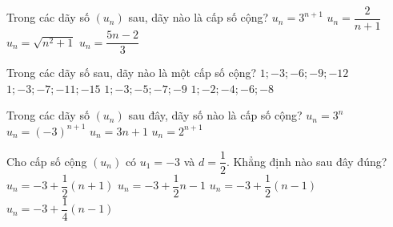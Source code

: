 \begin{ex}%
	Trong các dãy số $(u_n)$ sau, dãy nào là  cấp số cộng?
	 \choice
		 {$u_n={3^{n+1}}$}
		{$u_n=\dfrac{2}{n+1}$} 
		{$u_n=\sqrt{{n^2}+1}$} 
		{\True  $u_n=\dfrac{5n-2}{3}$}
\end{ex}

\begin{ex}%
	Trong các dãy số sau, dãy nào  là một cấp số cộng?
	\choice 
		 {$1;-3;-6;-9;-12$}
		 {\True $1;-3;-7;-11;-15$}
		{$1;-3;-5;-7;-9$} 
		{$1;-2;-4;-6;-8$} 
\end{ex}

\begin{ex}%
	Trong các dãy  số $(u_n)$ sau đây, dãy số nào là cấp số cộng?
	 \choice
		 {$u_n=3^n$}
		 {$u_n=(-3)^{n+1}$}
		{\True  $u_n=3n+1$}
		{$u_n=2^{n+1}$} 
\end{ex}

\begin{ex}%
	Cho cấp số  cộng $(u_n)$ có $u_1=-3$ và $d=\dfrac{1}{2}$. Khẳng định nào sau đây đúng?
	 \choice
		 {$u_n=-3+\dfrac{1}{2}(n+1)$}
		 {$u_n=-3+\dfrac{1}{2}n-1$}
		{\True $u_n=-3+\dfrac{1}{2}(n-1)$} 
		{$u_n=-3+\dfrac{1}{4}(n-1)$} 
\end{ex}

